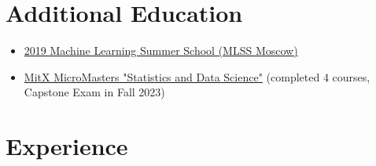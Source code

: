 \documentclass[unicode,a4paper,10pt]{article}
\begin{document}
\section{Additional Education}
\begin{itemize}
	\item \href{https://smiles.skoltech.ru/mlss2019}{2019 Machine Learning Summer School (MLSS Moscow)}
	\item \href{https://courses.edx.org/dashboard/programs/fa06b9c5-fe2b-41d8-a8c1-1bfd9c0d7b07/}{MitX MicroMasters "Statistics and Data Science"} (completed 4 courses, Capstone Exam in Fall 2023)
\end{itemize}
\section{Experience}
\end{document}
